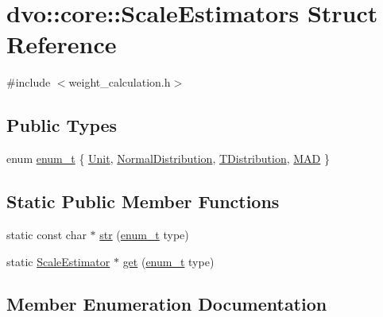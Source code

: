 \hypertarget{structdvo_1_1core_1_1_scale_estimators}{}\section{dvo\+:\+:core\+:\+:Scale\+Estimators Struct Reference}
\label{structdvo_1_1core_1_1_scale_estimators}


{\ttfamily \#include $<$weight\+\_\+calculation.\+h$>$}

\subsection*{Public Types}
\begin{DoxyCompactItemize}
\item 
enum \mbox{\hyperlink{structdvo_1_1core_1_1_scale_estimators_a5bd47dbbdca475d830703b07b0864f5e}{enum\+\_\+t}} \{ \mbox{\hyperlink{structdvo_1_1core_1_1_scale_estimators_a5bd47dbbdca475d830703b07b0864f5ea9e8578f3d264b0a23bb5a68b65046447}{Unit}}, 
\mbox{\hyperlink{structdvo_1_1core_1_1_scale_estimators_a5bd47dbbdca475d830703b07b0864f5ea4e0a707df958917341e1678c3fffcd18}{Normal\+Distribution}}, 
\mbox{\hyperlink{structdvo_1_1core_1_1_scale_estimators_a5bd47dbbdca475d830703b07b0864f5ea4a3e639cfc8f117ec843fe916b2134c4}{T\+Distribution}}, 
\mbox{\hyperlink{structdvo_1_1core_1_1_scale_estimators_a5bd47dbbdca475d830703b07b0864f5eae347cfd99f951301aaf3e172b4441499}{M\+AD}}
 \}
\end{DoxyCompactItemize}
\subsection*{Static Public Member Functions}
\begin{DoxyCompactItemize}
\item 
static const char $\ast$ \mbox{\hyperlink{structdvo_1_1core_1_1_scale_estimators_a96e97824b310becb2390c81e0d09f936}{str}} (\mbox{\hyperlink{structdvo_1_1core_1_1_scale_estimators_a5bd47dbbdca475d830703b07b0864f5e}{enum\+\_\+t}} type)
\item 
static \mbox{\hyperlink{classdvo_1_1core_1_1_scale_estimator}{Scale\+Estimator}} $\ast$ \mbox{\hyperlink{structdvo_1_1core_1_1_scale_estimators_a02a8b9af9cbd5e12b8b15e4c6cfa052a}{get}} (\mbox{\hyperlink{structdvo_1_1core_1_1_scale_estimators_a5bd47dbbdca475d830703b07b0864f5e}{enum\+\_\+t}} type)
\end{DoxyCompactItemize}


\subsection{Member Enumeration Documentation}
\mbox{\label{structdvo_1_1core_1_1_scale_estimators_a5bd47dbbdca475d830703b07b0864f5e}} 
